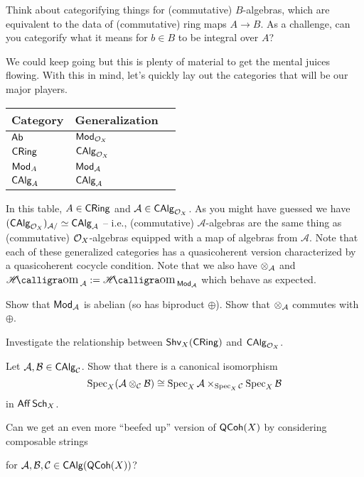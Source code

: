 \documentclass[11pt]{article}
\renewcommand{\AA}{\mathcal{A}}
\newcommand{\BB}{\mathcal{B}}
\newcommand{\CC}{\mathcal{C}}
\begin{document}
\begin{exercise}
Think about categorifying things for (commutative) $B$-algebras, which are equivalent to the data of (commutative) ring maps $A\to B$. As a challenge, can you categorify what it means for $b\in B$ to be integral over $A$?
\end{exercise}

We could keep going but this is plenty of material to get the mental juices flowing. With this in mind, let's quickly lay out the categories that will be our major players.

\begin{center}
\begin{tabular}{|l|l|l|}
\hline
Category & Generalization \\
\hline
$\operatorname{\mathsf{Ab}}$ & $\operatorname{\mathsf{Mod}}_{\mathcal{O}_X}$ \\
$\operatorname{\mathsf{CRing}}$ & $\operatorname{\mathsf{CAlg}}_{\mathcal{O}_X}$ \\
$\operatorname{\mathsf{Mod}}_A$ & $\Mod_{\AA}$ \\
$\operatorname{\mathsf{CAlg}}_A$ & $\CAlg_{\AA}$ \\
\hline
\end{tabular}
\end{center}

In this table, $A\in\operatorname{\mathsf{CRing}}$ and $\AA\in\CAlg_{\O_X}$. As you might have guessed we have $(\CAlg_{\O_X})_{\AA/}\simeq\CAlg_{\AA}$ -- i.e., (commutative) $\AA$-algebras are the same thing as (commutative) $\mathcal{O}_X$-algebras equipped with a map of algebras from $\AA$. Note that each of these generalized categories has a quasicoherent version characterized by a quasicoherent cocycle condition. Note that we also have $\tensor_{\AA}$ and $\HHom_{\AA}:=\HHom_{\Mod_{\AA}}$ which behave as expected.

\begin{exercise}
Show that $\Mod_{\AA}$ is abelian (so has biproduct $\oplus$). Show that $\tensor_{\AA}$ commutes with $\oplus$.
\end{exercise}

\begin{exercise}
Investigate the relationship between $\operatorname{\mathsf{Shv}}_X(\operatorname{\mathsf{CRing}})$ and $\operatorname{\mathsf{CAlg}}_{\mathcal{O}_X}$.
\end{exercise}

\begin{exercise}
Let $\AA,\BB\in\CAlg_{\CC}$. Show that there is a canonical isomorphism 
$$\Spec_X(\AA\tensor_{\CC}\BB)\iso\Spec_X\AA\times_{\Spec_X\CC}\Spec_X\BB$$ 
in $\operatorname{\mathsf{Aff}}\operatorname{\mathsf{Sch}}_X$.
\end{exercise}

\begin{exercise}
Can we get an even more ``beefed up'' version of $\operatorname{\mathsf{QCoh}}(X)$ by considering composable strings
\begin{center}
\end{center}
for $\AA,\BB,\CC\in\CAlg(\QCoh(X))$?
\end{exercise}
\end{document}
